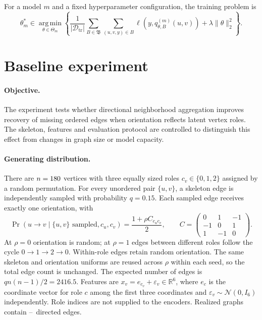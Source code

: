 \documentclass{article}
\begin{document}
For a model $m$ and a fixed hyperparameter configuration, the training problem is
\begin{equation}
\boxed{
\theta_m^*\in\operatorname*{arg\,min}_{\theta\in\Theta_m}
\left\{
\frac{1}{|\mathcal D_{\mathrm{tr}}|}
\sum_{B\in\mathfrak B}\sum_{(u,v,y)\in B}
\ell\!\left(y,q_{\theta,B}^{(m)}(u,v)\right)
+\lambda\|\theta\|_2^2
\right\}.}
\label{eq:objective}
\end{equation}


\section{Baseline experiment}
\label{sec:experiment}
\paragraph{Objective.}
The experiment tests whether directional neighborhood aggregation improves recovery of missing ordered edges when orientation reflects latent vertex roles.
The skeleton, features and evaluation protocol are controlled to distinguish this effect from changes in graph size or model capacity.

\paragraph{Generating distribution.}
There are $n=180$ vertices with three equally sized roles $c_v\in\{0,1,2\}$ assigned by a random permutation.
For every unordered pair $\{u,v\}$, a skeleton edge is independently sampled with probability $q=0.15$.
Each sampled edge receives exactly one orientation, with
\begin{equation}
\Pr(u\to v\mid\{u,v\}\text{ sampled},c_u,c_v)
=\frac{1+\rho C_{c_u c_v}}2,\qquad
C=\begin{pmatrix}0&1&-1\\-1&0&1\\1&-1&0\end{pmatrix}.
\end{equation}
At $\rho=0$ orientation is random; at $\rho=1$ edges between different roles follow the cycle $0\to1\to2\to0$.
Within-role edges retain random orientation.
The same skeleton and orientation uniforms are reused across $\rho$ within each seed, so the total edge count is unchanged.
The expected number of edges is $q n(n-1)/2=2416.5$.
Features are $x_v=e_{c_v}+\varepsilon_v\in\mathbb R^6$, where $e_c$ is the coordinate vector for role $c$ among the first three coordinates and $\varepsilon_v\sim\mathcal N(0,I_6)$ independently.
Role indices are not supplied to the encoders.
Realized graphs contain \EdgeMin--\EdgeMax\ directed edges.
\end{document}
